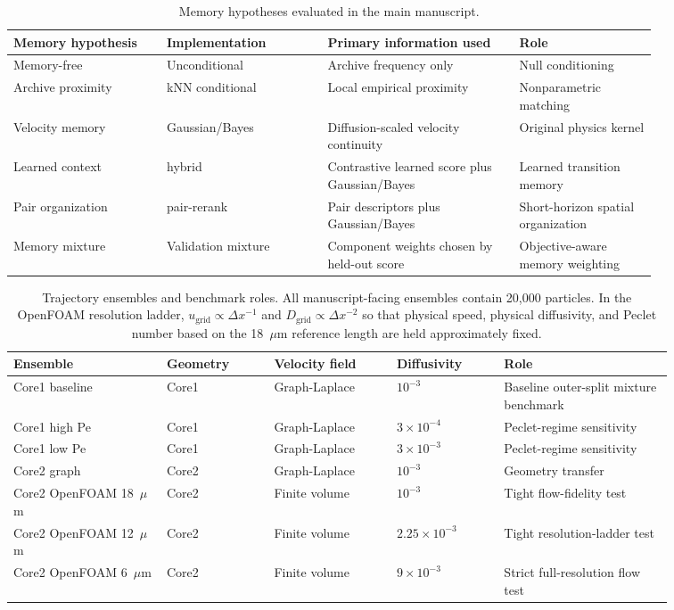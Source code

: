 \documentclass[11pt]{article}
\newcommand{\gb}{Gaussian/Bayes}
\newcommand{\knn}{kNN}
\newcommand{\hybrid}{hybrid}
\newcommand{\pair}{pair-rerank}
\begin{document}
\begin{table}[!htbp]
\centering
\caption{Memory hypotheses evaluated in the main manuscript.}
\label{tab:Ssamplers}
\small
\begin{tabular}{L{0.20\linewidth}L{0.21\linewidth}L{0.25\linewidth}L{0.18\linewidth}}
\toprule
Memory hypothesis & Implementation & Primary information used & Role \\
\midrule
Memory-free & Unconditional & Archive frequency only & Null conditioning \\
Archive proximity & \knn{} conditional & Local empirical proximity & Nonparametric matching \\
Velocity memory & \gb{} & Diffusion-scaled velocity continuity & Original physics kernel \\
Learned context & \hybrid{} & Contrastive learned score plus \gb{} & Learned transition memory \\
Pair organization & \pair{} & Pair descriptors plus \gb{} & Short-horizon spatial organization \\
Memory mixture & Validation mixture & Component weights chosen by held-out score & Objective-aware memory weighting \\
\bottomrule
\end{tabular}
\end{table}

\begin{table}[!htbp]
\centering
\caption{Trajectory ensembles and benchmark roles. All manuscript-facing ensembles contain 20,000 particles. In the OpenFOAM resolution ladder, $u_{\mathrm{grid}}\propto\Delta x^{-1}$ and $D_{\mathrm{grid}}\propto\Delta x^{-2}$ so that physical speed, physical diffusivity, and Peclet number based on the 18~$\mu$m reference length are held approximately fixed.}
\label{tab:Sexperiments}
\small
\begin{tabular}{@{}L{0.20\linewidth}L{0.14\linewidth}L{0.16\linewidth}L{0.14\linewidth}L{0.22\linewidth}@{}}
\toprule
Ensemble & Geometry & Velocity field & Diffusivity & Role \\
\midrule
Core1 baseline & Core1 & Graph-Laplace & $10^{-3}$ & Baseline outer-split mixture benchmark \\
Core1 high Pe & Core1 & Graph-Laplace & $3\times10^{-4}$ & Peclet-regime sensitivity \\
Core1 low Pe & Core1 & Graph-Laplace & $3\times10^{-3}$ & Peclet-regime sensitivity \\
Core2 graph & Core2 & Graph-Laplace & $10^{-3}$ & Geometry transfer \\
Core2 OpenFOAM 18~$\mu$m & Core2 & Finite volume & $10^{-3}$ & Tight flow-fidelity test \\
Core2 OpenFOAM 12~$\mu$m & Core2 & Finite volume & $2.25\times10^{-3}$ & Tight resolution-ladder test \\
Core2 OpenFOAM 6~$\mu$m & Core2 & Finite volume & $9\times10^{-3}$ & Strict full-resolution flow test \\
\bottomrule
\end{tabular}
\end{table}
\end{document}
